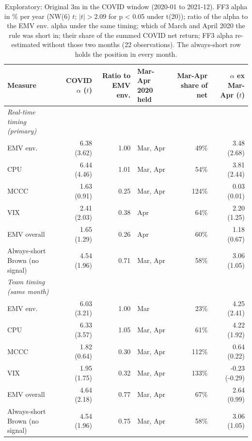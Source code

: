 \begin{table}[htbp]
\centering
\footnotesize
\caption{Exploratory: Original 3m in the COVID window (2020-01 to 2021-12). FF3 alpha in \% per year (NW(6) $t$; $|t| > 2.09$ for p < 0.05 under t(20)); ratio of the alpha to the EMV env. alpha under the same timing; which of March and April 2020 the rule was short in; their share of the summed COVID net return; FF3 alpha re-estimated without those two months (22 observations). The always-short row holds the position in every month.}
\label{tab:m1b_covid_attribution}
\begin{tabular}{lrrlrr}
\toprule
Measure & COVID $\alpha$ ($t$) & Ratio to EMV env. & Mar-Apr 2020 held & Mar-Apr share of net & $\alpha$ ex Mar-Apr ($t$) \\
\midrule
\textit{Real-time timing (primary)} &  &  &  &  &  \\
EMV env. & 6.38 (3.62) & 1.00 & Mar, Apr & 49\% & 3.48 (2.68) \\
CPU & 6.44 (4.46) & 1.01 & Mar, Apr & 54\% & 3.81 (2.44) \\
MCCC & 1.63 (0.91) & 0.25 & Mar, Apr & 124\% & 0.03 (0.01) \\
VIX & 2.41 (2.03) & 0.38 & Apr & 64\% & 2.20 (1.25) \\
EMV overall & 1.65 (1.29) & 0.26 & Apr & 60\% & 1.18 (0.67) \\
Always-short Brown (no signal) & 4.54 (1.96) & 0.71 & Mar, Apr & 58\% & 3.06 (1.05) \\
\textit{Team timing (same month)} &  &  &  &  &  \\
EMV env. & 6.03 (3.21) & 1.00 & Mar & 23\% & 4.25 (2.41) \\
CPU & 6.33 (3.57) & 1.05 & Mar, Apr & 61\% & 4.22 (1.92) \\
MCCC & 1.82 (0.64) & 0.30 & Mar, Apr & 112\% & 0.64 (0.22) \\
VIX & 1.95 (1.75) & 0.32 & Mar, Apr & 133\% & -0.23 (-0.29) \\
EMV overall & 4.64 (2.18) & 0.77 & Mar, Apr & 67\% & 2.64 (0.99) \\
Always-short Brown (no signal) & 4.54 (1.96) & 0.75 & Mar, Apr & 58\% & 3.06 (1.05) \\
\bottomrule
\end{tabular}
\end{table}
